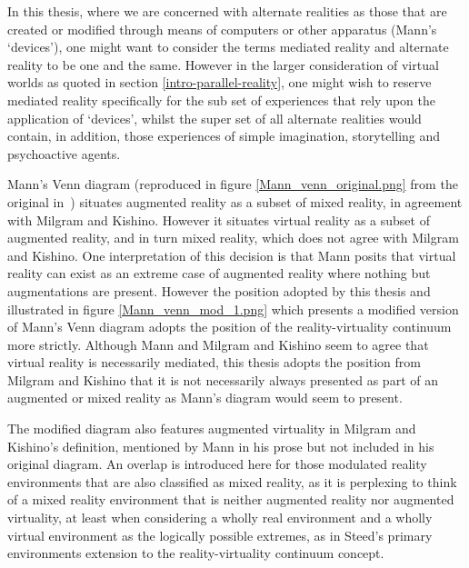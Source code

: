 
In this thesis, where we are concerned with alternate realities as those that are created or modified through means of computers or other apparatus (Mann's `devices'), one might want to consider the terms mediated reality and alternate reality to be one and the same. However in the larger consideration of virtual worlds as quoted in section \ref{intro-parallel-reality}, one might wish to reserve mediated reality specifically for the sub set of experiences that rely upon the application of `devices', whilst the super set of all alternate realities would contain, in addition, those experiences of simple imagination, storytelling and psychoactive agents.

Mann's Venn diagram (reproduced in figure \ref{Mann_venn_original.png} from the original in~\cite{Mann2002a}) situates augmented reality as a subset of mixed reality, in agreement with Milgram and Kishino. However it situates virtual reality as a subset of augmented reality, and in turn mixed reality, which does not agree with Milgram and Kishino. One interpretation of this decision is that Mann posits that virtual reality can exist as an extreme case of augmented reality where nothing but augmentations are present. However the position adopted by this thesis and illustrated in figure \ref{Mann_venn_mod_1.png} which presents a modified version of Mann's Venn diagram adopts the position of the reality-virtuality continuum more strictly. Although Mann and Milgram and Kishino seem to agree that virtual reality is necessarily mediated, this thesis adopts the position from Milgram and Kishino that it is not necessarily always presented as part of an augmented or mixed reality as Mann's diagram would seem to present.


The modified diagram also features augmented virtuality in Milgram and Kishino's definition, mentioned by Mann in his prose but not included in his original diagram. An overlap is introduced here for those modulated reality environments that are also classified as mixed reality, as it is perplexing to think of a mixed reality environment that is neither augmented reality nor augmented virtuality, at least when considering a wholly real environment and a wholly virtual environment as the logically possible extremes, as in Steed's primary environments extension to the reality-virtuality continuum concept.


